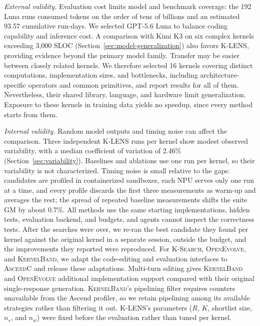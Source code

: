 \documentclass[acmsmall,screen,review,anonymous,nonacm]{acmart}
\newcommand{\klens}{\textsc{K-LENS}\xspace}
\newcommand{\ksearch}{\textsc{K-Search}\xspace}
\newcommand{\kernelband}{\textsc{KernelBand}\xspace}
\newcommand{\openevolve}{\textsc{OpenEvolve}\xspace}
\newcommand{\ascendc}{\textsc{AscendC}\xspace}
\begin{document}
\emph{External validity.} Evaluation cost limits model and benchmark coverage:
the 192 Luna runs consumed tokens on the order of tens of billions and an
estimated 93.57 cumulative run-days. We selected GPT-5.6 Luna to balance coding
capability and inference cost. A comparison with Kimi K3 on six complex kernels exceeding
3{,}000 SLOC (Section~\ref{sec:model-generalization}) also favors \klens, providing
evidence beyond the primary model family. Transfer may be easier between closely
related kernels. We therefore selected 16 kernels covering distinct computations,
implementation sizes, and bottlenecks, including architecture-specific operators
and common primitives, and report results for all of them.
Nevertheless, their shared library, language, and hardware limit generalization. Exposure to
these kernels in training data yields no speedup, since every method starts from
them.

\emph{Internal validity.} Random model outputs and timing noise can affect the
comparison. Three independent \klens runs per kernel show modest observed
variability, with a median coefficient of variation of 2.46\%
(Section~\ref{sec:variability}). Baselines and ablations use one run per kernel, so their variability
is not characterized.
Timing noise is small relative to the gaps: candidates are profiled in containerized
sandboxes, each NPU serves only one run at a time, and every profile discards the first three
measurements as warm-up and averages the rest; %
the spread of repeated baseline measurements shifts the suite GM by about 0.7\%.
All methods use the same starting implementations, hidden
tests, evaluation backend, and budgets, and agents cannot inspect the correctness tests. After the searches were over, we re-ran the best
candidate they found per kernel against the original kernel in a separate session, outside the
budget, and the improvements they reported were reproduced. For \ksearch, \openevolve, and \kernelband, we
adapt the code-editing and evaluation interfaces to \ascendc and release these
adaptations. Multi-turn editing gives \kernelband and \openevolve additional
implementation support compared with their original single-response generation.
\kernelband's pipelining filter requires counters unavailable from the Ascend
profiler, so we retain pipelining among its available strategies rather than
filtering it out.
\klens's parameters ($R$, $K$, shortlist size, $n_s$, and $n_w$) were fixed
before the evaluation rather than tuned per kernel. %
\end{document}
